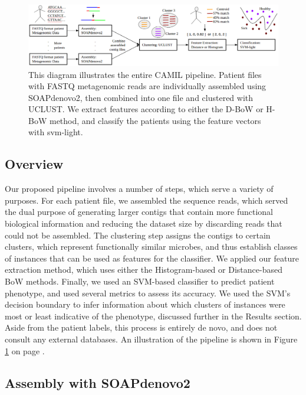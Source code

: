 
\begin{figure}[t]
\centering
\includegraphics[scale=0.5]{./mil-metagenomics-pipeline.png}
\caption{This diagram illustrates the entire CAMIL pipeline. Patient files with FASTQ metagenomic reads are individually assembled using SOAPdenovo2, then combined into one file and clustered with UCLUST. We extract features according to either the D-BoW or H-BoW method, and classify the patients using the feature vectors with svm-light.} \label{pipeline}
\end{figure}

\subsection{Overview}

Our proposed pipeline involves a number of steps, which serve a variety of purposes. For each patient file, we assembled the sequence reads, which served the dual purpose of generating larger contigs that contain more functional biological information and reducing the dataset size by discarding reads that could not be assembled. The clustering step assigns the contigs to certain clusters, which represent functionally similar microbes, and thus establish classes of instances that can be used as features for the classifier. We  applied our feature extraction method, which uses either the Histogram-based or Distance-based BoW methods. Finally, we used an SVM-based classifier to predict patient phenotype, and used several metrics to assess its accuracy. We used the SVM's decision boundary to infer information about which clusters of instances were most or least indicative of the phenotype, discussed further in the Results section. Aside from the patient labels, this process is entirely de novo, and does not consult any external databases. An illustration of the pipeline is shown in Figure \ref{pipeline} on page \pageref{pipeline}.

\subsection{Assembly with SOAPdenovo2}

